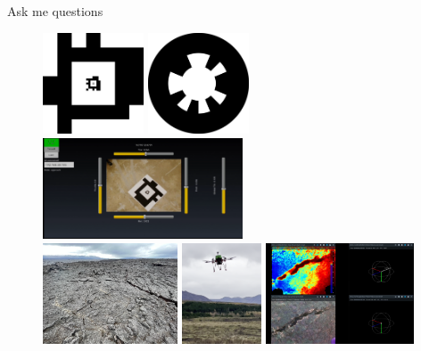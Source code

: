 \documentclass[aspectratio=169]{beamer}
\begin{document}
\begin{frame}{Ask me questions}
	\vspace{0.5cm}
	\begin{figure}[]
	    \centering
		\includegraphics[height=3cm]{./images/tagCustom24h10_00002_00001_00000}
		\hfill
		\includegraphics[height=3cm]{./images/whycode_20_8}
		\hfill
		\includegraphics[height=3cm]{./images/demo_screenshot}\\
		\includegraphics[height=3cm]{./images/lava_smooth}
		\hfill
		\includegraphics[height=3cm]{./images/depth_drone_flying}
		\hfill
		\includegraphics[height=3cm]{./images/depth_data}
	\end{figure}
\end{frame}
\end{document}
